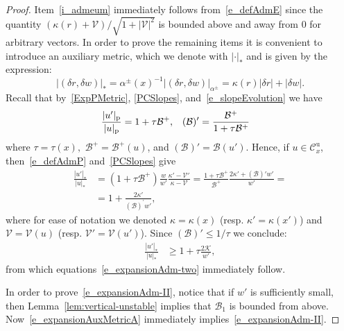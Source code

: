\documentclass[10pt]{amsart}
\theoremstyle{definition}\newtheorem{defi}[theo]{Definition}\newtheorem{rema}[theo]{Remark}\newtheorem{exam}[theo]{Example}\newtheorem{exem}[theo]{Example}\newtheorem{nota}[theo]{Notation}
\newcommand{\ct}{r}
\newcommand{\fft}{\tau}
\newcommand{\curv}{\kappa}
\newcommand{\inv}{^{-1}}
\newcommand{\unstable}{\text{u}}
\newcommand{\cB}{\mathcal{B}}
\newcommand{\cK}{\mathcal{K}}
\newcommand{\pslope}{\mathcal{B}}
\newcommand{\cslope}{\mathcal{V}}
\newcommand{\cone}{\mathcal{C}}
\newcommand{\coneu}{\cone^\unstable}
\newcommand{\ppPrivate}[2]{#1^{#2}}
\newcommand{\prePrivate}[1]{\ppPrivate{#1}{-}}
\newcommand{\postPrivate}[1]{\ppPrivate{#1}{+}}
\newcommand{\prpslope}{\prePrivate{\pslope}}
\newcommand{\popslope}{\postPrivate{\pslope}}
\newcommand{\pme}{_\textup{p}}
\newcommand{\admPm}{_{\alpha^{\pm}}}
\newcommand{\aum}{_{*}}
\newcommand{\admFuncPm}{\alpha^{\pm}}
\renewcommand{\prpslope}{\cB}
\renewcommand{\prpslope}{\cB}
\renewcommand{\prpslope}{\cB}
\begin{document}
\begin{proof}
Item~\eqref{i_admeum} immediately follows from~\eqref{e_defAdmE} since the quantity $(\curv(r)+\cslope)/\sqrt{1+|\cslope|^{2}}$ is bounded above and away from $0$ for arbitrary vectors. In order to prove the remaining items it is convenient to introduce an auxiliary metric, which we denote with $|\cdot|\aum$ and is given by the expression:
\begin{equation}\label{StarMetric}
|(\delta\ct, \delta w)|\aum
= \admFuncPm(x)\inv|(\delta\ct,\delta w)|\admPm = \curv(\ct) |\delta\ct|+|\delta w|.
\end{equation}
Recall that by~\eqref{ExpPMetric}, \eqref{PCSlopes}, and~\eqref{e_slopeEvolution} we have
\begin{align*}
\frac{|u'|\pme}{|u|\pme} &= 1 + \fft\popslope,& (\prpslope)^{\prime}&=\frac{\popslope}{1+\fft \popslope}
\end{align*}
where $\fft = \fft(x),$ $\popslope = \popslope(u)$, and $(\prpslope)'=\prpslope(u')$. Hence, if $u\in\coneu_x$, then~\eqref{e_defAdmP} and~\eqref{PCSlopes} give
\begin{equation}\label{e_expansionAuxMetricA}
\begin{split}
\frac{|u'|\aum}{|u|\aum} &= (1 + \fft\popslope) \frac{w}{w'}\frac{\curv'-\cslope'}{\curv-\cslope} = \frac{1 + \fft\popslope}{\popslope}
\frac{2\curv'+(\prpslope)' w'}{w'} = \\ 
& = 1+\frac{2\curv'}{(\prpslope)^{\prime}w'},
\end{split}
\end{equation}
where for ease of notation we denoted $\curv = \curv(x)$ (resp. $\curv' = \curv(x')$) and $\cslope = \cslope(u)$ (resp. $\cslope' = \cslope(u')$). Since $(\prpslope)'\leq 1/\fft$ we conclude:
\begin{align}
\frac{|u'|\aum}{|u|\aum} & \ge \label{e_expansionAuxMetricB}
1+\fft\frac{2\cK}{w'},
\end{align}
from which equations~\eqref{e_expansionAdm-two} immediately follow.

In order to prove~\eqref{e_expansionAdm-II}, notice that if $w'$ is sufficiently small, then Lemma~\ref{lem:vertical-unstable} implies that $\prpslope_{1}$ is bounded from above. Now~\eqref{e_expansionAuxMetricA} immediately implies~\eqref{e_expansionAdm-II}.


\end{proof}
\end{document}
